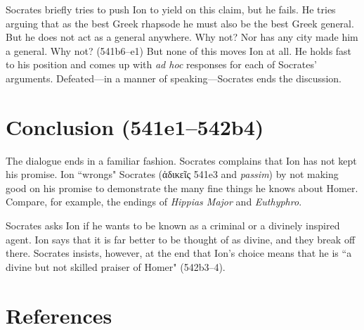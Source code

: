 \documentclass[12pt,letterpaper]{article}
\begin{document}
Socrates briefly tries to push Ion to yield on this claim, but he fails. He tries arguing that as the best Greek rhapsode he must also be the best Greek general. But he does not act as a general anywhere. Why not?  Nor has any city made him a general. Why not? (541b6--e1) But none of this moves Ion at all. He holds fast to his position and comes up with \textit{ad hoc} responses for each of Socrates' arguments. Defeated---in a manner of speaking---Socrates ends the discussion.


\section{Conclusion (541e1--542b4)}

The dialogue ends in a familiar fashion. Socrates complains that Ion has not kept his promise. Ion ``wrongs" Socrates (\textgreek{ἀδικεῖς} 541e3 and \textit{passim}) by not making good on his promise to demonstrate the many fine things he knows about Homer. Compare, for example, the endings of \textit{Hippias Major} and \textit{Euthyphro}.

Socrates asks Ion if he wants to be known as a criminal or a divinely inspired agent. Ion says that it is far better to be thought of as divine, and they break off there. Socrates insists, however, at the end that Ion's choice means that he is ``a divine but not skilled praiser of Homer" (542b3--4).


\newpage
\section{References}
\printbibliography[heading=none]
\end{document}
